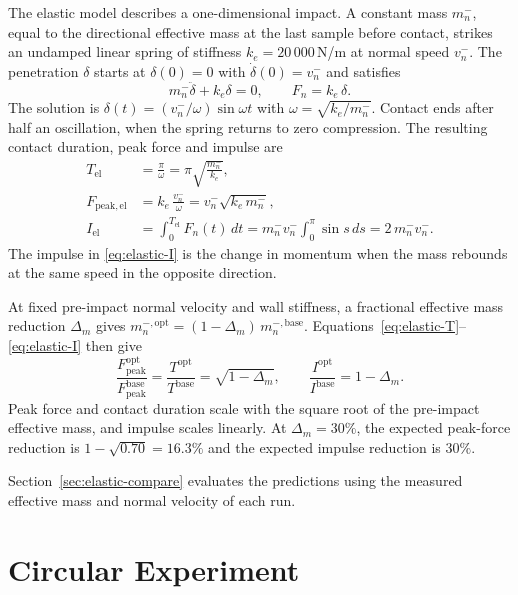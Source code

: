 \documentclass[12pt,a4paper]{article}
\newcommand{\ms}{m_n^-}
\newcommand{\vs}{v_n^-}
\begin{document}
The elastic model describes a one-dimensional impact. A constant mass $\ms$, equal
to the directional effective mass at the last sample before contact, strikes an undamped
linear spring of stiffness $k_e = 20\,000$\,N/m at normal speed $\vs$. The penetration
$\delta$ starts at $\delta(0)=0$ with $\dot\delta(0)=\vs$ and satisfies
\begin{equation}
  \ms \ddot\delta + k_e \delta = 0, \qquad F_n = k_e\,\delta .
  \label{eq:elastic-model}
\end{equation}
The solution is $\delta(t) = (\vs/\omega)\sin\omega t$ with $\omega=\sqrt{k_e/\ms}$.
Contact ends after half an oscillation, when the spring returns to zero compression.
The resulting contact duration, peak force and impulse are
\begin{align}
  T_{\mathrm{el}} &= \frac{\pi}{\omega} = \pi\sqrt{\frac{\ms}{k_e}},
  \label{eq:elastic-T}\\
  F_{\mathrm{peak,el}} &= k_e\,\frac{\vs}{\omega} = \vs\sqrt{k_e\, \ms},
  \label{eq:elastic-F}\\
  I_{\mathrm{el}} &= \int_0^{T_{\mathrm{el}}} F_n(t)\,dt
     = \ms \vs \int_0^{\pi} \sin s\, ds = 2\, \ms \vs .
  \label{eq:elastic-I}
\end{align}
The impulse in \eqref{eq:elastic-I} is the change in momentum when the mass rebounds
at the same speed in the opposite direction.

At fixed pre-impact normal velocity and wall stiffness, a fractional effective mass
reduction $\Delta_m$ gives $m_n^{-,\mathrm{opt}} = (1-\Delta_m)\, m_n^{-,\mathrm{base}}$.
Equations~\eqref{eq:elastic-T}--\eqref{eq:elastic-I} then give
\begin{equation}
  \frac{F^{\mathrm{opt}}_{\mathrm{peak}}}{F^{\mathrm{base}}_{\mathrm{peak}}}
  = \frac{T^{\mathrm{opt}}}{T^{\mathrm{base}}} = \sqrt{1-\Delta_m},
  \qquad
  \frac{I^{\mathrm{opt}}}{I^{\mathrm{base}}} = 1-\Delta_m .
  \label{eq:elastic-ratio}
\end{equation}
Peak force and contact duration scale with the square root of the pre-impact
effective mass, and impulse scales linearly. At $\Delta_m = 30\%$, the expected peak-force
reduction is $1-\sqrt{0.70} = 16.3\%$ and the expected impulse reduction is $30\%$.

Section~\ref{sec:elastic-compare} evaluates the predictions using the measured
effective mass and normal velocity of each run.

\section{Circular Experiment}
\end{document}
